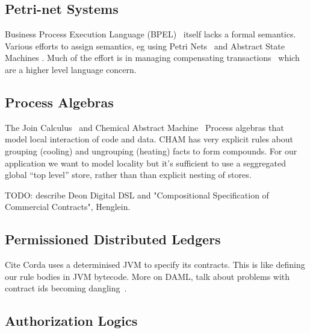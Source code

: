 

\subsection{Petri-net Systems}


Business Process Execution Language (BPEL)~\cite{Andrews2003:BPEL} itself lacks a formal semantics. Various efforts to assign semantics, eg using Petri Nets~\cite{Lohmann2009:PetriBPEL} and Abstract State Machines \cite{Fahland2005:SemanticsBPEL}. Much of the effort is in managing compensating transactions~\cite{Colombo2011:Compensating} which are a higher level language concern.


\subsection{Process Algebras}
The Join Calculus~\cite{Cedric1996:Reflexive} and Chemical Abstract Machine~\cite{Berry1992:Chemical} Process algebras that model local interaction of code and data. CHAM has very explicit rules about grouping (cooling) and ungrouping (heating) facts to form compounds. For our application we want to model locality but it's sufficient to use a seggregated global ``top level'' store, rather than than explicit nesting of stores.

TODO: describe Deon Digital DSL and "Compositional Specification of Commercial Contracts", Henglein.

\subsection{Permissioned Distributed Ledgers}
\label{s:RelatedPermissioned}
Cite Corda uses a determinised JVM to specify its contracts. This is like defining our rule bodies in JVM bytecode.
More on DAML, talk about problems with contract ids becoming dangling~\cite{DA2019:DAML}.

\subsection{Authorization Logics}


